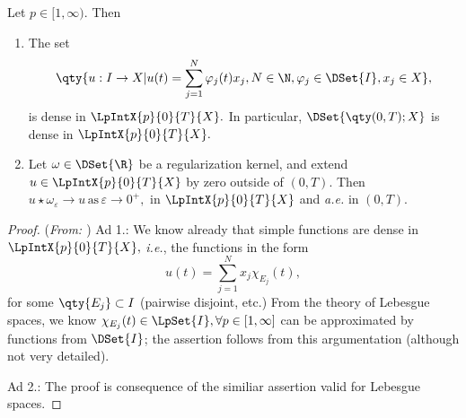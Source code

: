 \begin{lemma}
    Let $p \in [1, \infty).$ Then
    \begin{enumerate}
	    \item The set
		    \[
			    \qty{u: I \to X | u(t) = \sum_{j=1}^N \varphi_j(t) x_j, N \in \N, \varphi_j \in \DSet{I}, x_j \in X},
		    \]
		    is dense in $\LpIntX{p}{0}{T}{X}.$ In particular, $\DSet{\qty(0,T);X}$ is dense in $\LpIntX{p}{0}{T}{X}.$
	    \item Let $\omega \in \DSet{\R}$ be a regularization kernel, and extend $u \in \LpIntX{p}{0}{T}{X}$ by zero outside of $(0,T)$. Then $u\star \omega_{\varepsilon} \to u \, \text{as} \,\varepsilon \to 0^+,$ in $\LpIntX{p}{0}{T}{X}$ and \textit{a.e.} in $(0,T).$
    \end{enumerate}
\end{lemma}
\begin{proof}(\textit{From: \cite{bulicekUvodModerniTeorie2018}})
    Ad 1.:
    We know already that simple functions are dense in $\LpIntX{p}{0}{T}{X},$ \textit{i.e.}, the functions in the form
    \[
	    u(t) = \sum_{j=1}^N x_j \chi_{E_j}(t),
    \]
    for some $\qty{E_j} \subset I$ (pairwise disjoint, etc.) From the theory of Lebesgue spaces, we know $\chi_{E_j}(t) \in \LpSet{I}, \forall p \in [1, \infty]$ can be approximated by functions from $\DSet{I}$; the assertion follows from this argumentation (although not very detailed).


    Ad 2.: The proof is consequence of the similiar assertion valid for Lebesgue spaces.
\end{proof}

